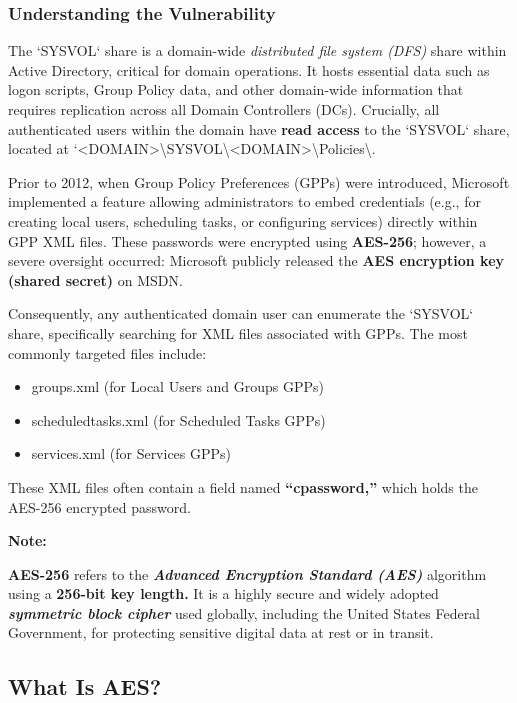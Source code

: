 \subsubsection{Understanding the Vulnerability}

The `SYSVOL` share is a domain-wide \textit{ distributed file system (DFS) } share within Active Directory, critical for domain operations. It hosts essential data such as logon scripts, Group Policy data, and other domain-wide information that requires replication across all Domain Controllers (DCs). Crucially, all authenticated users within the domain have \textbf{ read access} to the `SYSVOL` share, located at `<DOMAIN>\textbackslash{}SYSVOL\textbackslash{}<DOMAIN>\textbackslash{}Policies\textbackslash{}.

Prior to 2012, when Group Policy Preferences (GPPs) were introduced, Microsoft implemented a feature allowing administrators to embed credentials (e.g., for creating local users, scheduling tasks, or configuring services) directly within GPP XML files. These passwords were encrypted using \textbf{AES-256}; however, a severe oversight occurred: Microsoft publicly released the \textbf{AES encryption key (shared secret)} on MSDN.

Consequently, any authenticated domain user can enumerate the `SYSVOL` share, specifically searching for XML files associated with GPPs. The most commonly targeted files include:

\begin{itemize}
    \item groups.xml (for Local Users and Groups GPPs)
    \item scheduledtasks.xml (for Scheduled Tasks GPPs)
    \item services.xml (for Services GPPs)
\end{itemize}

These XML files often contain a field named \textbf{“cpassword,”} which holds the AES-256 encrypted password.

\textbf{Note:}

\textbf{AES-256} refers to the \textit{\textbf{Advanced Encryption Standard (AES)}} algorithm using a \textbf{256-bit key length. }It is a highly secure and widely adopted \textit{\textbf{symmetric block cipher}} used globally, including the United States Federal Government, for protecting sensitive digital data at rest or in transit.

\subsection{\textbf{What Is AES?}}


